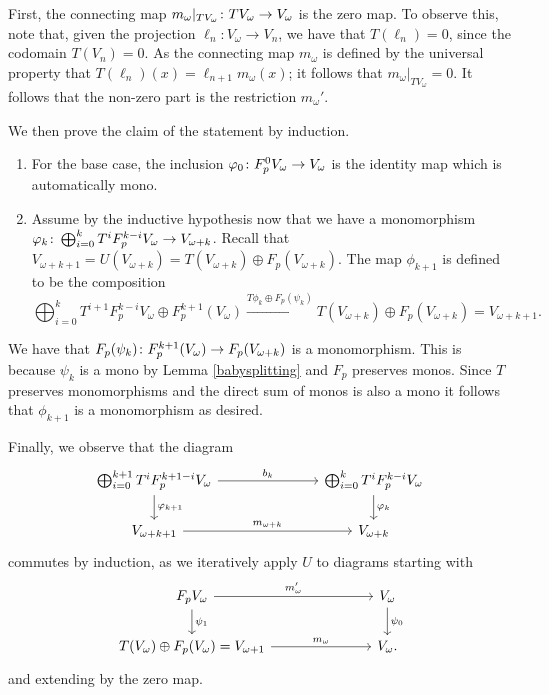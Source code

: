 \documentclass[runningheads]{llncs}
\begin{document}
\begin{proofE}
First, the connecting map $m_{\omega}|_{T V_{\omega}} \colon TV_{\omega} \to V_{\omega}$ is the zero map. To observe this, note that, given the  projection $\ell_n: V_{\omega} \to V_n$, we have that $T(\ell_n) = 0$, since the codomain $T(V_n ) = 0.$ As the connecting map $m_\omega$ is defined by the universal property that $T(\ell_n)(x) = \ell_{n+1}m_{\omega}(x)$; it follows that  $m_{\omega}|_{T V_{\omega}} = 0 $. It follows that the non-zero part is the restriction $m_{\omega}'.$

We then prove the claim of the statement by induction.
\begin{enumerate}
\item
 For the base case, the inclusion $\varphi_0 \colon F_p^0 V_{\omega} \to  V_{\omega}$ is the identity map which is automatically mono. 
\item
  Assume by the inductive hypothesis now that we have a monomorphism  $\varphi_k \colon  \bigoplus_{i=0}^{k} T^i F_p^{k-i } V_\omega \to  V_{\omega+k}$.
  Recall that $V_{\omega+k +1} = U(V_{\omega+k}) = T(V_{\omega+k}) \oplus F_p(V_{\omega+k}).$ The map $\phi_{k+1}$ is defined to be the composition
\begin{equation*}
 \bigoplus_{i=0}^{k} T^{i+1} F_p^{k-i } V_\omega \oplus F_p^{k+1}(V_{\omega}) \xrightarrow{T\phi_k \oplus  F_p (\psi_k)} T(V_{\omega+k}) \oplus F_p(V_{\omega+k}) = V_{\omega+k+1}.
\end{equation*}
\end{enumerate}
We have that $F_p (\psi_k) \colon  F_p^{k+1}(V_{\omega}) \to F_p(V_{\omega+k})$ is a monomorphism. This is because $\psi_k$ is a mono by Lemma \ref{babysplitting} and $F_p$ preserves monos. Since $T$ preserves monomorphisms and the direct sum of monos is also a mono it follows that $\phi_{k+1}$ is a monomorphism as desired.

Finally, we observe that the diagram 
\begin{equation*}
\begin{tikzcd}
 \bigoplus_{i=0}^{k+1} T^i F_p^{k+1-i } V_\omega \dar{\phi_{k+1}}  \arrow[rrr, "b_k"] &&& \bigoplus_{i=0}^{k} T^i F_p^{k-i } V_\omega \dar{\phi_k}
\\
V_{\omega +k+1} \arrow[rrr, "m_{\omega + k}"] &&& V_{\omega +k}
\end{tikzcd}
\end{equation*}
commutes by induction, as we iteratively apply $U$ to diagrams starting with
\begin{equation*}
\begin{tikzcd}
  F_p V_\omega \dar{\psi_{1}}  \arrow[rrr, "m'_{\omega}"] &&&  V_\omega \dar{\psi_0}
\\
 T(V_\omega)  \oplus F_p(V_{\omega}) = V_{\omega +1} \arrow[rrr, "m_{\omega}"] &&& V_{\omega}.
\end{tikzcd}
\end{equation*}
and extending by the zero map.
 \end{proofE}
\end{document}
